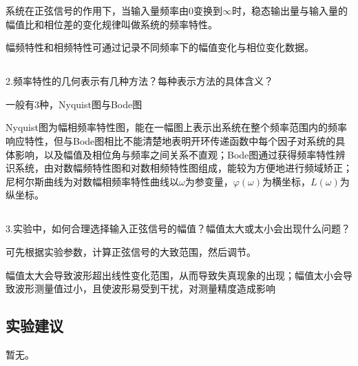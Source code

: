 \documentclass[UTF8,a4paper,10pt]{ctexart}
\begin{document}
	系统在正弦信号的作用下，当输入量频率由0变换到$\infty$时，稳态输出量与输入量的幅值比和相位差的变化规律叫做系统的频率特性。
	
	幅频特性和相频特性可通过记录不同频率下的幅值变化与相位变化数据。
	\subsection{}
	2.频率特性的几何表示有几种方法？每种表示方法的具体含义？
	
	一般有3种，Nyquist图与Bode图
	
	Nyquist图为幅相频率特性图，能在一幅图上表示出系统在整个频率范围内的频率响应特性，但与Bode图相比不能清楚地表明开环传递函数中每个因子对系统的具体影响，以及幅值及相位角与频率之间关系不直观；Bode图通过获得频率特性辨识系统，由对数幅频特性图和对数相频特性图组成，能较为方便地进行频域矫正；尼柯尔斯曲线为对数幅相频率特性曲线以$\omega$为参变量，$\varphi(\omega)$为横坐标，$L(\omega)$为纵坐标。
	
	\subsection{}
	3.实验中，如何合理选择输入正弦信号的幅值？幅值太大或太小会出现什么问题？
	
	可先根据实验参数，计算正弦信号的大致范围，然后调节。
	
	幅值太大会导致波形超出线性变化范围，从而导致失真现象的出现；幅值太小会导致波形测量值过小，且使波形易受到干扰，对测量精度造成影响
	\subsection{实验建议}
	暂无。
	
\end{document}
